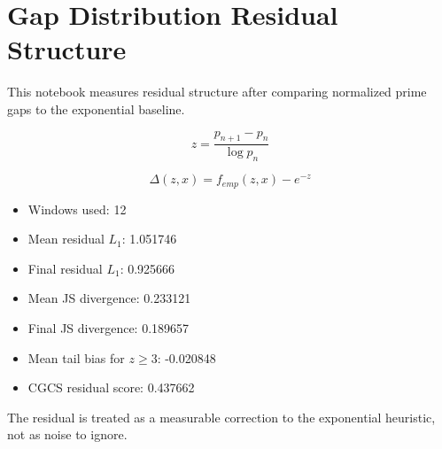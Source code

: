 \section*{Gap Distribution Residual Structure}

This notebook measures residual structure after comparing normalized prime gaps to the exponential baseline.

\[
z = \frac{p_{n+1}-p_n}{\log p_n}
\]

\[
\Delta(z,x)=f_{emp}(z,x)-e^{-z}
\]

\begin{itemize}
  \item Windows used: 12
  \item Mean residual $L_1$: 1.051746
  \item Final residual $L_1$: 0.925666
  \item Mean JS divergence: 0.233121
  \item Final JS divergence: 0.189657
  \item Mean tail bias for $z\ge3$: -0.020848
  \item CGCS residual score: 0.437662
\end{itemize}

The residual is treated as a measurable correction to the exponential heuristic, not as noise to ignore.
